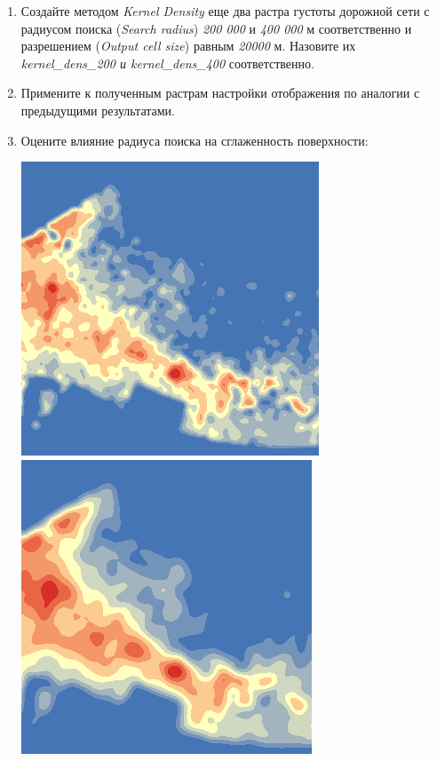\documentclass[]{book}
\theoremstyle{definition}
\theoremstyle{definition}
\theoremstyle{definition}
\theoremstyle{remark}
\begin{document}
\begin{enumerate}
\def\labelenumi{\arabic{enumi}.}
\item
  Создайте методом \emph{Kernel Density} еще два растра густоты дорожной
  сети с радиусом поиска (\emph{Search radius}) \emph{200 000} и
  \emph{400 000} м соответственно и разрешением (\emph{Output cell
  size}) равным \emph{20000} м. Назовите их \emph{kernel\_dens\_200 и
  kernel\_dens\_400} соответственно.
\item
  Примените к полученным растрам настройки отображения по аналогии с
  предыдущими результатами.
\item
  Оцените влияние радиуса поиска на сглаженность поверхности:

  \includegraphics{images/Ex16/image11.png}
  \includegraphics{images/Ex16/image12.png}

\end{enumerate}
\end{document}
